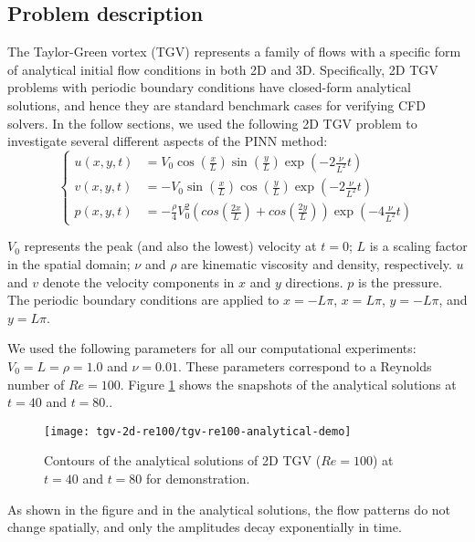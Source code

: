
\subsection{Problem description}

The Taylor-Green vortex (TGV) represents a family of flows with a specific form of analytical initial flow conditions in both 2D and 3D.
Specifically, 2D TGV problems with periodic boundary conditions have closed-form analytical solutions, and hence they are standard benchmark cases for verifying CFD solvers. 
In the follow sections, we used the following 2D TGV problem to investigate several different aspects of the PINN method:
\begin{equation}\label{eq:tgv}
    \left\{
        \begin{aligned}
            u(x, y, t) &= V_0\cos(\frac{x}{L})\sin(\frac{y}{L})\exp(-2\frac{\nu}{L^2}t) \\
            v(x, y, t) &= - V_0 \sin(\frac{x}{L})\cos(\frac{y}{L})\exp(-2\frac{\nu}{L^2}t) \\
            p(x, y, t) &= -\frac{\rho}{4}V_0^2\left(cos(\frac{2x}{L}) + cos(\frac{2y}{L})\right)\exp(-4\frac{\nu}{L^2}t)
        \end{aligned}
    \right.
\end{equation}

\noindent $V_0$ represents the peak (and also the lowest) velocity at $t=0$;
$L$ is a scaling factor in the spatial domain;
$\nu$ and $\rho$ are kinematic viscosity and density, respectively.
$u$ and $v$ denote the velocity components in $x$ and $y$ directions.
$p$ is the pressure.
The periodic boundary conditions are applied to $x=-L\pi$, $x=L\pi$, $y=-L\pi$, and $y=L\pi$.

We used the following parameters for all our computational experiments: $V_0=L=\rho=1.0$ and $\nu=0.01$.
These parameters correspond to a Reynolds number of $Re=100$.
Figure \ref{fig:tgv-analytical-demo} shows the snapshots of the analytical solutions at $t=40$ and $t=80$..
\begin{figure}[H]
    \centering
    \texttt{[image: tgv-2d-re100/tgv-re100-analytical-demo]}%
    \caption{Contours of the analytical solutions of 2D TGV ($Re=100$) at $t=40$ and $t=80$ for demonstration.}\label{fig:tgv-analytical-demo}
\end{figure}

\noindent As shown in the figure and in the analytical solutions, the flow patterns do not change spatially, and only the amplitudes decay exponentially in time.

